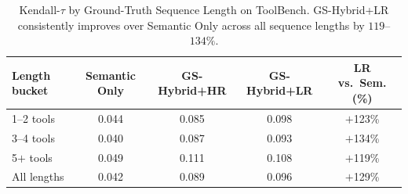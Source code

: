 \begin{table}[!t]
\caption{Kendall-$\tau$ by Ground-Truth Sequence Length on ToolBench.
GS-Hybrid+LR consistently improves over Semantic Only across all sequence lengths
by $119$--$134\%$.}
\label{tab:length}
\centering
\small
\begin{tabular}{lcccc}
\toprule
\textbf{Length bucket} & \textbf{Semantic Only} & \textbf{GS-Hybrid+HR} & \textbf{GS-Hybrid+LR} & \textbf{LR vs.\ Sem. (\%)} \\
\midrule
1--2 tools & 0.044 & 0.085 & 0.098 & $+$123\% \\
3--4 tools & 0.040 & 0.087 & 0.093 & $+$134\% \\
5$+$ tools & 0.049 & 0.111 & 0.108 & $+$119\% \\
\midrule
All lengths & 0.042 & 0.089 & 0.096 & $+$129\% \\
\bottomrule
\end{tabular}
\end{table}
